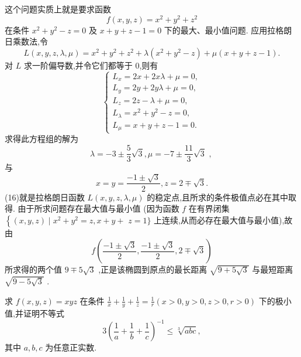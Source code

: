 \begin{solution}

\end{solution}
这个问题实质上就是要求函数
\[
f\left( {x,y,z}\right)  = {x}^{2} + {y}^{2} + {z}^{2}
\]
在条件 \({x}^{2} + {y}^{2} - z = 0\) 及 \(x + y + z - 1 = 0\) 下的最大、最小值问题. 应用拉格朗日乘数法,令
\[
L\left( {x,y,z,\lambda ,\mu }\right)  = {x}^{2} + {y}^{2} + {z}^{2} + \lambda \left( {{x}^{2} + {y}^{2} - z}\right)  + \mu \left( {x + y + z - 1}\right) .
\]
对 \(L\) 求一阶偏导数,并令它们都等于 0,则有
\[
\left\{  \begin{array}{l} {L}_{x} = {2x} + {2x\lambda } + \mu  = 0, \\  {L}_{y} = {2y} + {2y\lambda } + \mu  = 0, \\  {L}_{z} = {2z} - \lambda  + \mu  = 0, \\  {L}_{\lambda } = {x}^{2} + {y}^{2} - z = 0, \\  {L}_{\mu } = x + y + z - 1 = 0. \end{array}\right.
\]
求得此方程组的解为
\[
\lambda  =  - 3 \pm  \frac{5}{3}\sqrt{3},\mu  =  - 7 \pm  \frac{11}{3}\sqrt{3}\text{ , }
\]
与
\[
x = y = \frac{-1 \pm  \sqrt{3}}{2},z = 2 \mp  \sqrt{3}. \tag{16}
\]
(16)就是拉格朗日函数 \(L\left( {x,y,z,\lambda ,\mu }\right)\) 的稳定点,且所求的条件极值点必在其中取得. 由于所求问题存在最大值与最小值 (因为函数 \(f\) 在有界闭集 \(\left\{  {\left( {x,y,z}\right)  \mid  {x}^{2} + {y}^{2} = z,x + y + }\right.\)  \(z = 1\}\) 上连续,从而必存在最大值与最小值),故由
\[
f\left( {\frac{-1 \pm  \sqrt{3}}{2},\frac{-1 \pm  \sqrt{3}}{2},2 \mp  \sqrt{3}}\right)
\]
所求得的两个值 \(9 \mp  5\sqrt{3}\) ,正是该椭圆到原点的最长距离 \(\sqrt{9 + 5\sqrt{3}}\) 与最短距离 \(\sqrt{9 - 5\sqrt{3}}\) .

\begin{example}

\end{example}
求 \(f\left( {x,y,z}\right)  = {xyz}\) 在条件 \(\frac{1}{x} + \frac{1}{y} + \frac{1}{z} = \frac{1}{r}\left( {x > 0,y > 0,z > 0,r > 0}\right)\) 下的极小值,并证明不等式
\[
3{\left( \frac{1}{a} + \frac{1}{b} + \frac{1}{c}\right) }^{-1} \leq  \sqrt[3]{abc},
\]
其中 \(a,b,c\) 为任意正实数.

